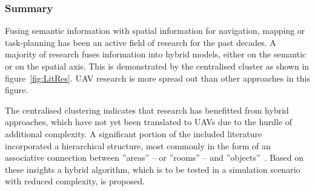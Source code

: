\documentclass[twocolumn,letterpaper]{IEEEAerospaceCLS}  %
\begin{document}
\subsubsection{Summary} \label{sssec:ResLitSum}
Fusing semantic information with spatial information for navigation, mapping or task-planning has been an active field of research for the past decades. A majority of research fuses information into hybrid models, either on the semantic or on the spatial axis. This is demonstrated by the centralised cluster as shown in figure~\ref{fig:LitRes}. UAV research is more spread out than other approaches in this figure.

The centralised clustering indicates that research has benefitted from hybrid approaches, which have not yet been translated to UAVs due to the hurdle of additional complexity. A significant portion of the included literature incorporated a hierarchical structure, most commonly in the form of an associative connection between ''areas'' -- or ''rooms'' -- and ''objects''~\cite{galindo_robot_2008,zhang_hierarchical_2019,chaplot_object_2020,tenorth_knowrob-map_2010,borkowski_towards_2010,kuipers_spatial_2000,cavaliere_empowering_2018,cavaliere_towards_2016}. Based on these insights a hybrid algorithm, which is to be tested in a simulation scenario with reduced complexity, is proposed.
\end{document}

